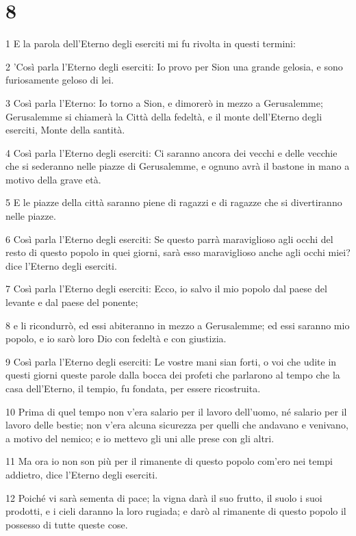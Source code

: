 \chapter{8}

\par 1 E la parola dell'Eterno degli eserciti mi fu rivolta in questi termini:
\par 2 'Così parla l'Eterno degli eserciti: Io provo per Sion una grande gelosia, e sono furiosamente geloso di lei.
\par 3 Così parla l'Eterno: Io torno a Sion, e dimorerò in mezzo a Gerusalemme; Gerusalemme si chiamerà la Città della fedeltà, e il monte dell'Eterno degli eserciti, Monte della santità.
\par 4 Così parla l'Eterno degli eserciti: Ci saranno ancora dei vecchi e delle vecchie che si sederanno nelle piazze di Gerusalemme, e ognuno avrà il bastone in mano a motivo della grave età.
\par 5 E le piazze della città saranno piene di ragazzi e di ragazze che si divertiranno nelle piazze.
\par 6 Così parla l'Eterno degli eserciti: Se questo parrà maraviglioso agli occhi del resto di questo popolo in quei giorni, sarà esso maraviglioso anche agli occhi miei? dice l'Eterno degli eserciti.
\par 7 Così parla l'Eterno degli eserciti: Ecco, io salvo il mio popolo dal paese del levante e dal paese del ponente;
\par 8 e li ricondurrò, ed essi abiteranno in mezzo a Gerusalemme; ed essi saranno mio popolo, e io sarò loro Dio con fedeltà e con giustizia.
\par 9 Così parla l'Eterno degli eserciti: Le vostre mani sian forti, o voi che udite in questi giorni queste parole dalla bocca dei profeti che parlarono al tempo che la casa dell'Eterno, il tempio, fu fondata, per essere ricostruita.
\par 10 Prima di quel tempo non v'era salario per il lavoro dell'uomo, né salario per il lavoro delle bestie; non v'era alcuna sicurezza per quelli che andavano e venivano, a motivo del nemico; e io mettevo gli uni alle prese con gli altri.
\par 11 Ma ora io non son più per il rimanente di questo popolo com'ero nei tempi addietro, dice l'Eterno degli eserciti.
\par 12 Poiché vi sarà sementa di pace; la vigna darà il suo frutto, il suolo i suoi prodotti, e i cieli daranno la loro rugiada; e darò al rimanente di questo popolo il possesso di tutte queste cose.
